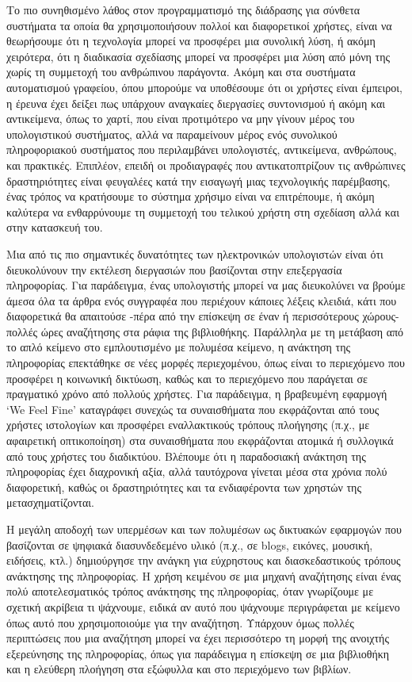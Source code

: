 \documentclass[
]{article}
\begin{document}
Το πιο συνηθισμένο λάθος στον προγραμματισμό της διάδρασης για σύνθετα
συστήματα τα οποία θα χρησιμοποιήσουν πολλοί και διαφορετικοί χρήστες,
είναι να θεωρήσουμε ότι η τεχνολογία μπορεί να προσφέρει μια συνολική
λύση, ή ακόμη χειρότερα, ότι η διαδικασία σχεδίασης μπορεί να προσφέρει
μια λύση από μόνη της χωρίς τη συμμετοχή του ανθρώπινου παράγοντα. Ακόμη
και στα συστήματα αυτοματισμού γραφείου, όπου μπορούμε να υποθέσουμε ότι
οι χρήστες είναι έμπειροι, η έρευνα έχει δείξει πως υπάρχουν αναγκαίες
διεργασίες συντονισμού ή ακόμη και αντικείμενα, όπως το χαρτί, που είναι
προτιμότερο να μην γίνουν μέρος του υπολογιστικού συστήματος, αλλά να
παραμείνουν μέρος ενός συνολικού πληροφοριακού συστήματος που
περιλαμβάνει υπολογιστές, αντικείμενα, ανθρώπους, και πρακτικές.
Επιπλέον, επειδή οι προδιαγραφές που αντικατοπτρίζουν τις ανθρώπινες
δραστηριότητες είναι φευγαλέες κατά την εισαγωγή μιας τεχνολογικής
παρέμβασης, ένας τρόπος να κρατήσουμε το σύστημα χρήσιμο είναι να
επιτρέπουμε, ή ακόμη καλύτερα να ενθαρρύνουμε τη συμμετοχή του τελικού
χρήστη στη σχεδίαση αλλά και στην κατασκευή του.

Μια από τις πιο σημαντικές δυνατότητες των ηλεκτρονικών υπολογιστών
είναι ότι διευκολύνουν την εκτέλεση διεργασιών που βασίζονται στην
επεξεργασία πληροφορίας. Για παράδειγμα, ένας υπολογιστής μπορεί να μας
διευκολύνει να βρούμε άμεσα όλα τα άρθρα ενός συγγραφέα που περιέχουν
κάποιες λέξεις κλειδιά, κάτι που διαφορετικά θα απαιτούσε -πέρα από την
επίσκεψη σε έναν ή περισσότερους χώρους- πολλές ώρες αναζήτησης στα
ράφια της βιβλιοθήκης. Παράλληλα με τη μετάβαση από το απλό κείμενο στο
εμπλουτισμένο με πολυμέσα κείμενο, η ανάκτηση της πληροφορίας επεκτάθηκε
σε νέες μορφές περιεχομένου, όπως είναι το περιεχόμενο που προσφέρει η
κοινωνική δικτύωση, καθώς και το περιεχόμενο που παράγεται σε πραγματικό
χρόνο από πολλούς χρήστες. Για παράδειγμα, η βραβευμένη εφαρμογή `We
Feel Fine' καταγράφει συνεχώς τα συναισθήματα που εκφράζονται από τους
χρήστες ιστολογίων και προσφέρει εναλλακτικούς τρόπους πλοήγησης (π.χ.,
με αφαιρετική οπτικοποίηση) στα συναισθήματα που εκφράζονται ατομικά ή
συλλογικά από τους χρήστες του διαδικτύου. Βλέπουμε ότι η παραδοσιακή
ανάκτηση της πληροφορίας έχει διαχρονική αξία, αλλά ταυτόχρονα γίνεται
μέσα στα χρόνια πολύ διαφορετική, καθώς οι δραστηριότητες και τα
ενδιαφέροντα των χρηστών της μετασχηματίζονται.

Η μεγάλη αποδοχή των υπερμέσων και των πολυμέσων ως δικτυακών εφαρμογών
που βασίζονται σε ψηφιακά διασυνδεδεμένο υλικό (π.χ., σε blogs, εικόνες,
μουσική, ειδήσεις, κτλ.) δημιούργησε την ανάγκη για εύχρηστους και
διασκεδαστικούς τρόπους ανάκτησης της πληροφορίας. Η χρήση κειμένου σε
μια μηχανή αναζήτησης είναι ένας πολύ αποτελεσματικός τρόπος ανάκτησης
της πληροφορίας, όταν γνωρίζουμε με σχετική ακρίβεια τι ψάχνουμε, ειδικά
αν αυτό που ψάχνουμε περιγράφεται με κείμενο όπως αυτό που
χρησιμοποιούμε για την αναζήτηση. Υπάρχουν όμως πολλές περιπτώσεις που
μια αναζήτηση μπορεί να έχει περισσότερο τη μορφή της ανοιχτής
εξερεύνησης της πληροφορίας, όπως για παράδειγμα η επίσκεψη σε μια
βιβλιοθήκη και η ελεύθερη πλοήγηση στα εξώφυλλα και στο περιεχόμενο των
βιβλίων.
\end{document}
